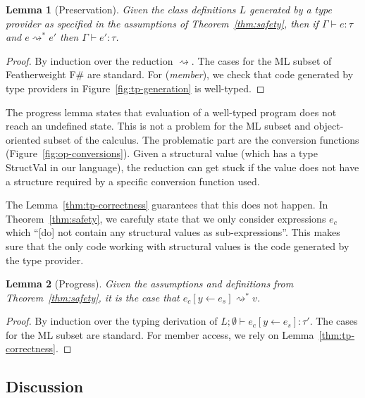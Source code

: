 \documentclass[preprint]{sigplanconf}
\newcommand{\ident}[1]{\textnormal{\sffamily #1}}
\newcommand{\reduce}{\rightsquigarrow}
\newtheorem{lemma}{Lemma}
\begin{document}
\begin{lemma}[Preservation]
\label{thm:rs-preservation}
Given the class definitions $L$ generated by a type provider as specified in
the assumptions of Theorem~\ref{thm:safety}, then if $\Gamma \vdash e : \tau$ and 
$e \reduce^{*} e'$ then $\Gamma \vdash e' : \tau$.
\end{lemma}
\begin{proof}
By induction over the reduction $\reduce$. The cases for the ML subset of Featherweight F\# 
are standard. For (\emph{member}), we check that code generated by type providers
in Figure~\ref{fig:tp-generation} is well-typed.
\end{proof}

\noindent
The progress lemma states that evaluation of a well-typed program does not reach an undefined state. 
This is not a problem for the ML subset and object-oriented subset of the calculus. The problematic
part are the conversion functions (Figure~\ref{fig:op-conversions}). Given a structural value 
(which has a type \ident{StructVal} in our language), the reduction can get stuck if the value does
not have a structure required by a specific conversion function used.

The Lemma~\ref{thm:tp-correctness} guarantees that this does not happen. In Theorem~\ref{thm:safety},
we carefuly state that we only consider expressions $e_c$ which ``[do] not contain any structural 
values as sub-expressions''. This makes sure that the only code working with structural values is the
code generated by the type provider.

\begin{lemma}[Progress]
\label{thm:rs-progress}
Given the assumptions and definitions from Theorem~\ref{thm:safety}, it is the case that
$e_c[y\leftarrow e_s] \reduce^{*} v$.
\end{lemma}
\begin{proof}
By induction over the typing derivation of $L; \emptyset \vdash e_c[y\leftarrow e_s] : \tau'$. 
The cases for the ML subset are standard. For member access, we rely on Lemma~\ref{thm:tp-correctness}.
\end{proof}


\subsection{Discussion}
\label{sec:safety-discuss}
\end{document}
